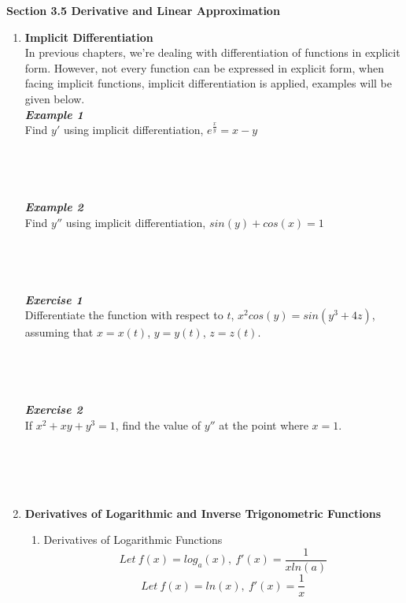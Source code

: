 \documentclass[12px]{article}
\begin{document}
\begin{center}
    \Large\textbf{Section 3.5 Derivative and Linear Approximation}
\end{center}
\begin{enumerate}
    \item \textbf{Implicit Differentiation}\\
    In previous chapters, we’re dealing with differentiation of functions in explicit form. However, not every function can be expressed in explicit form, when facing implicit functions, implicit differentiation is applied, examples will be given below.\\
    \textbf{\textit{Example 1}}\\
    Find $y'$ using implicit differentiation, $e^{\frac{x}{y}}=x-y$\\
    \\
    \\
    \\
    \\
    \textbf{\textit{Example 2}}\\
    Find $y''$ using implicit differentiation, $sin(y)+cos(x)=1$\\
    \\
    \\
    \\
    \\
    \textbf{\textit{Exercise 1}}\\
    Differentiate the function with respect to $t$, $x^2cos(y)=sin(y^3+4z)$,\\ assuming that $x=x(t)$, $y=y(t)$, $z=z(t)$.\\
    \\
    \\
    \\
    \\
    \textbf{\textit{Exercise 2}}\\
    If $x^2+xy+y^3=1$, find the value of $y''$ at the point where $x=1$.\\
    \\
    \\
    \\
    \\
    \item \textbf{Derivatives of Logarithmic and Inverse Trigonometric Functions}
    \begin{enumerate}[(1)]
        \item Derivatives of Logarithmic Functions
        $$Let\ f(x)=log_{a}(x),\ f'(x)=\frac{1}{xln(a)}$$
        $$Let\ f(x)=ln(x),\ f'(x)=\frac{1}{x}$$

\end{enumerate}
\end{enumerate}
\end{document}
